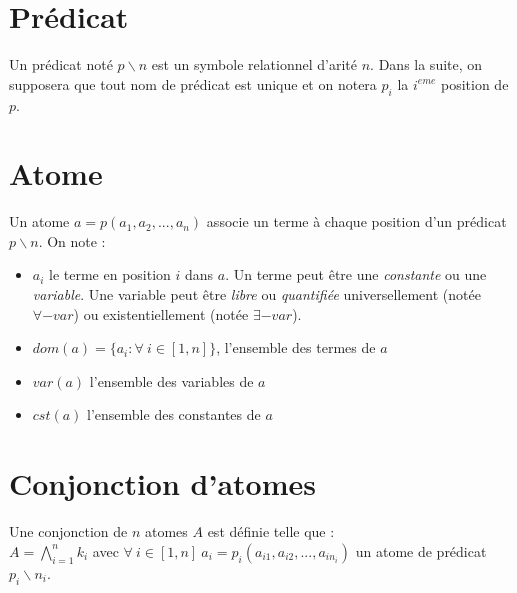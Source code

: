
\section{Pr\'edicat}\label{def_predicat}
Un pr\'edicat not\'e $p \backslash n$ est un symbole relationnel d'arit\'e $n$.
Dans la suite, on supposera que tout nom de pr\'edicat est unique et
on notera $p_{i}$ la $i^{eme}$ position de $p$.

\section{Atome}\label{def_atome}
Un atome $a = p(a_{1},a_{2},...,a_{n})$ associe un terme \`a chaque position d'un pr\'edicat $p \backslash n$.
On note :
\begin{itemize}
	\item $a_{i}$ le terme en position $i$ dans $a$. Un terme peut \^etre une {\em constante} 
	ou une {\em variable}.
	Une variable peut \^etre {\em libre}  ou {\em quantifiée} universellement 
	(not\'ee $\forall-var$) ou existentiellement (not\'ee $\exists-var$).
	\item $dom(a) = \{a_{i} : \forall\ i \in [1,n]\}$, l'ensemble des termes de $a$
	\item $var(a)$ l'ensemble des variables de $a$
	\item $cst(a)$ l'ensemble des constantes de $a$
\end{itemize}

\section{Conjonction d'atomes}\label{def_conjonction}
Une conjonction de $n$ atomes $A$ est définie telle que :\\
$A = \bigwedge_{i = 1}^{n}k_i$
avec $\forall\ i \in [1,n]\ a_i = p_i(a_{i1},a_{i2},...,a_{in_i})$ un atome de prédicat 
$p_i \backslash n_i$. 


